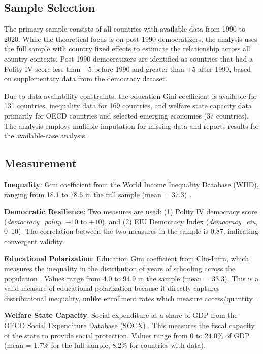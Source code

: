 \documentclass[11pt,letterpaper]{article}
\begin{document}
\subsection{Sample Selection}

The primary sample consists of all countries with available data from 1990 to 2020. While the theoretical focus is on post-1990 democratizers, the analysis uses the full sample with country fixed effects to estimate the relationship across all country contexts. Post-1990 democratizers are identified as countries that had a Polity IV score less than $-5$ before 1990 and greater than $+5$ after 1990, based on supplementary data from the \cite{Cheibub2010} democracy dataset.

Due to data availability constraints, the education Gini coefficient is available for 131 countries, inequality data for 169 countries, and welfare state capacity data primarily for OECD countries and selected emerging economies (37 countries). The analysis employs multiple imputation for missing data and reports results for the available-case analysis.

\subsection{Measurement}

\textbf{Inequality}: Gini coefficient from the World Income Inequality Database (WIID), ranging from 18.1 to 78.6 in the full sample (mean = 37.3) \citep{UNUWIDER2024}.

\textbf{Democratic Resilience}: Two measures are used: (1) Polity IV democracy score (\textit{democracy\_polity}, $-10$ to $+10$), and (2) EIU Democracy Index (\textit{democracy\_eiu}, 0--10). The correlation between the two measures in the sample is 0.87, indicating convergent validity.

\textbf{Educational Polarization}: Education Gini coefficient from Clio-Infra, which measures the inequality in the distribution of years of schooling across the population \citep{Thomas2001}. Values range from 4.0 to 94.9 in the sample (mean = 33.3). This is a valid measure of educational polarization because it directly captures distributional inequality, unlike enrollment rates which measure access/quantity \citep{Thomas2001, CrespoCuaresma2016}.

\textbf{Welfare State Capacity}: Social expenditure as a share of GDP from the OECD Social Expenditure Database (SOCX) \citep{OECD2025}. This measures the fiscal capacity of the state to provide social protection. Values range from 0 to 24.0\% of GDP (mean = 1.7\% for the full sample, 8.2\% for countries with data).
\end{document}
